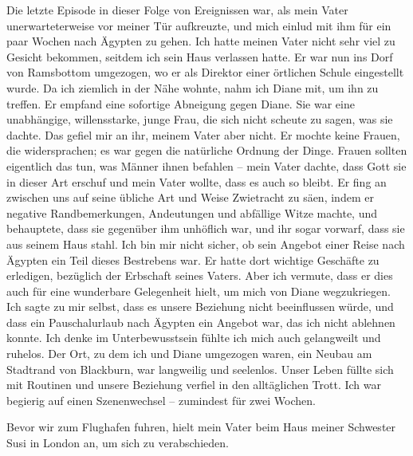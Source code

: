 \documentclass[12pt]{memoir}
\begin{document}
Die letzte Episode in dieser Folge von Ereignissen war,
als mein Vater unerwarteterweise vor meiner Tür aufkreuzte,
und mich einlud mit ihm für ein paar Wochen nach Ägypten zu gehen.
Ich hatte meinen Vater nicht sehr viel zu Gesicht bekommen,
seitdem ich sein Haus verlassen hatte.
Er war nun ins Dorf von Ramsbottom umgezogen,
wo er als Direktor einer örtlichen Schule eingestellt wurde.
Da ich ziemlich in der Nähe wohnte, nahm ich Diane mit, um ihn zu treffen.
Er empfand eine sofortige Abneigung gegen Diane.
Sie war eine unabhängige, willensstarke, junge Frau,
die sich nicht scheute zu sagen, was sie dachte.
Das gefiel mir an ihr, meinem Vater aber nicht.
Er mochte keine Frauen, die widersprachen;
es war gegen die natürliche Ordnung der Dinge.
Frauen sollten eigentlich das tun, was Männer ihnen befahlen –
mein Vater dachte, dass Gott sie in dieser Art erschuf und mein Vater wollte,
dass es auch so bleibt.
Er fing an zwischen uns auf seine übliche Art und Weise Zwietracht zu säen,
indem er negative Randbemerkungen, Andeutungen und abfällige Witze machte,
und behauptete, dass sie gegenüber ihm unhöflich war, und ihr sogar vorwarf,
dass sie aus seinem Haus stahl.
Ich bin mir nicht sicher, ob sein Angebot einer Reise nach Ägypten
ein Teil dieses Bestrebens war.
Er hatte dort wichtige Geschäfte zu erledigen,
bezüglich der Erbschaft seines Vaters.
Aber ich vermute, dass er dies auch für eine wunderbare Gelegenheit hielt,
um mich von Diane wegzukriegen.
Ich sagte zu mir selbst, dass es unsere Beziehung nicht beeinflussen würde,
und dass ein Pauschalurlaub nach Ägypten ein Angebot war,
das ich nicht ablehnen konnte.
Ich denke im Unterbewusstsein fühlte ich mich auch gelangweilt und ruhelos.
Der Ort, zu dem ich und Diane umgezogen waren,
ein Neubau am Stadtrand von Blackburn, war langweilig und seelenlos.
Unser Leben füllte sich mit Routinen und unsere Beziehung
verfiel in den alltäglichen Trott.
Ich war begierig auf einen Szenenwechsel – zumindest für zwei Wochen.

Bevor wir zum Flughafen fuhren,
hielt mein Vater beim Haus meiner Schwester Susi in London an,
um sich zu verabschieden.
\end{document}
